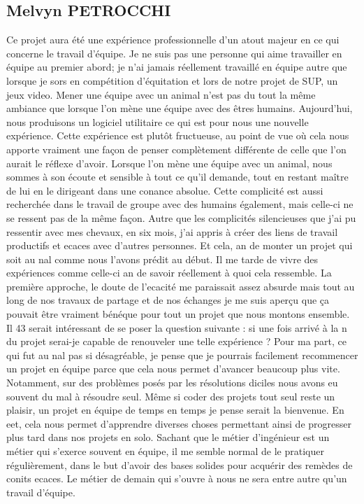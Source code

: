 \documentclass[12pt,a4paper]{article}
\begin{document}
\subsection{Melvyn PETROCCHI}
Ce projet aura été une expérience professionnelle d'un atout
majeur en ce qui concerne le travail d'équipe. Je ne suis pas une
personne qui aime travailler en équipe au premier abord; je n'ai jamais réellement travaillé
en équipe autre que lorsque je sors en compétition d'équitation et lors de notre projet de SUP, un jeux video.
Mener une équipe avec un animal n'est pas du tout la même
ambiance que lorsque l'on mène une équipe avec des êtres
humains. Aujourd'hui, nous produisons un logiciel utilitaire ce qui est pour nous une nouvelle expérience.
Cette expérience est plutôt fructueuse, au point de vue où
cela nous apporte vraiment une façon de penser complètement
différente de celle que l'on aurait le réflexe d'avoir. 
Lorsque l'on mène une équipe
avec un animal, nous sommes à son écoute et sensible à tout ce
qu'il demande, tout en restant maître de lui en le dirigeant dans
une conance absolue. Cette complicité est aussi recherchée dans
le travail de groupe avec des humains également, mais celle-ci ne
se ressent pas de la même façon. Autre que les complicités
silencieuses que j'ai pu ressentir avec mes chevaux, en six mois,
j'ai appris à créer des liens de travail productifs et ecaces avec
d'autres personnes. Et cela, an de monter un projet qui soit au
nal comme nous l'avons prédit au début. Il me tarde de vivre des
expériences comme celle-ci an de savoir réellement à quoi cela
ressemble.
La première approche, le doute de l'ecacité me paraissait
assez absurde mais tout au long de nos travaux de partage et de
nos échanges je me suis aperçu que ça pouvait être vraiment
bénéque pour tout un projet que nous montons ensemble. Il
43
serait intéressant de se poser la question suivante : si une fois
arrivé à la n du projet serai-je capable de renouveler une telle
expérience ? Pour ma part, ce qui fut au nal pas si désagréable,
je pense que je pourrais facilement recommencer un projet en
équipe parce que cela nous permet d'avancer beaucoup plus vite.
Notamment, sur des problèmes posés par les résolutions diciles
nous avons eu souvent du mal à résoudre seul. Même si coder des
projets tout seul reste un plaisir, un projet en équipe de temps en
temps je pense serait la bienvenue.
En eet, cela nous permet d'apprendre diverses choses
permettant ainsi de progresser plus tard dans nos projets en solo.
Sachant que le métier d'ingénieur est un métier qui s'exerce
souvent en équipe, il me semble normal de le pratiquer
régulièrement, dans le but d'avoir des bases solides pour acquérir
des remèdes de conits ecaces.
Le métier de demain qui s'ouvre à nous ne sera entre autre
qu'un travail d'équipe.
\end{document}
